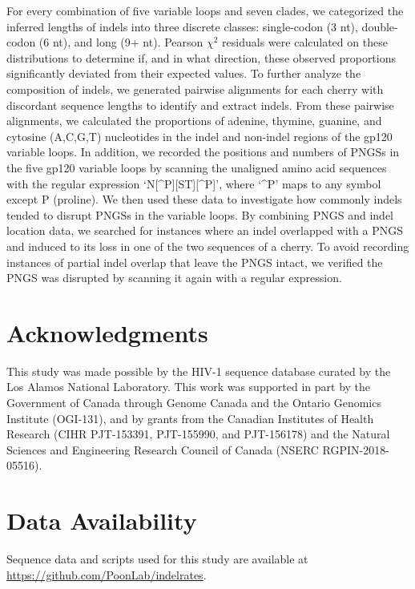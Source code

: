 \documentclass[12pt]{article}
\newcommand{\todo}[2]{\hl{\textbf{#1:} #2}}
\begin{document}
For every combination of five variable loops and seven clades, we categorized the inferred lengths of indels into three discrete classes: single-codon (3 nt), double-codon (6 nt), and long (9+ nt).
Pearson $\chi^2$ residuals were calculated on these distributions to determine if, and in what direction, these observed proportions significantly deviated from their expected values. 
To further analyze the composition of indels, we generated pairwise alignments for each cherry with discordant sequence lengths to identify and extract indels.   
From these pairwise alignments, we calculated the proportions of adenine, thymine, guanine, and cytosine (A,C,G,T) nucleotides in the indel and non-indel regions of the gp120 variable loops.
In addition, we recorded the positions and numbers of PNGSs in the five gp120 variable loops by scanning the unaligned amino acid sequences with the regular expression `N[\^{}P][ST][\^{}P]', where `\^{}P' maps to any symbol except P (proline). 
We then used these data to investigate how commonly indels tended to disrupt PNGSs in the variable loops.   
By combining PNGS and indel location data, we searched for instances where an indel overlapped with a PNGS and induced to its loss in one of the two sequences of a cherry. 
To avoid recording instances of partial indel overlap that leave the PNGS intact, we verified the PNGS was disrupted by scanning it again with a regular expression. 


\section * {Acknowledgments}
This study was made possible by the HIV-1 sequence database curated by the Los Alamos National Laboratory. 
This work was supported in part by the Government of Canada through Genome Canada and the Ontario Genomics Institute (OGI-131), and by grants from the Canadian Institutes of Health Research (CIHR PJT-153391, PJT-155990, and PJT-156178) and the Natural Sciences and Engineering Research Council of Canada (NSERC RGPIN-2018-05516).

\section * {Data Availability}
Sequence data and scripts used for this study are available at \url{https://github.com/PoonLab/indelrates}. 

\clearpage


\end{document}
